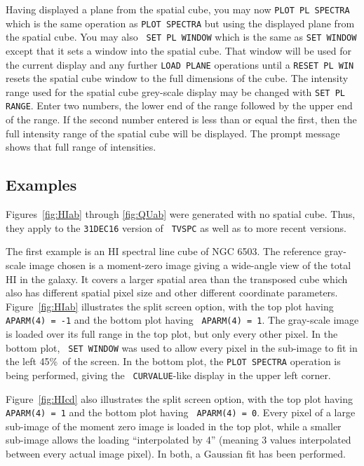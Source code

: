 \documentclass[twoside]{article}
\begin{document}
Having displayed a plane from the spatial cube, you may now {\tt PLOT
  PL SPECTRA} which is the same operation as {\tt PLOT SPECTRA} but
using the displayed plane from the spatial cube.  You may also {\tt
  SET PL WINDOW} which is the same as {\tt SET WINDOW} except that it
sets a window into the spatial cube.  That window will be used for the
current display and any further {\tt LOAD PLANE} operations until a
{\tt RESET PL WIN} resets the spatial cube window to the full
dimensions of the cube.  The intensity range used for the spatial cube
grey-scale display may be changed with {\tt SET PL RANGE}\@.  Enter
two numbers, the lower end of the range followed by the upper end of
the range.  If the second number entered is less than or equal the
first, then the full intensity range of the spatial cube will be
displayed.  The prompt message shows that full range of intensities.

\subsection{Examples}

Figures~\ref{fig:HIab} through \ref{fig:QUab} were generated with no
spatial cube.  Thus, they apply to the {\tt 31DEC16} version of {\tt
  TVSPC} as well as to more recent versions.

The first example is an HI spectral line cube of NGC 6503.  The
reference gray-scale image chosen is a moment-zero image giving a
wide-angle view of the total HI in the galaxy.  It covers a larger
spatial area than the transposed cube which also has different spatial
pixel size and other different coordinate parameters.
Figure~\ref{fig:HIab} illustrates the split screen option, with the
top plot having {\tt APARM(4) = -1} and the bottom plot having {\tt
  APARM(4) = 1}\@.  The gray-scale image is loaded over its full range
in the top plot, but only every other pixel.  In the bottom plot, {\tt
  SET WINDOW} was used to allow every pixel in the sub-image to fit in
the left 45\%\ of the screen.  In the bottom plot, the {\tt PLOT
  SPECTRA} operation is being performed, giving the {\tt
  CURVALUE}-like display in the upper left corner.

Figure~\ref{fig:HIcd} also illustrates the split screen option, with
the top plot having {\tt APARM(4) = 1} and the bottom plot having {\tt
  APARM(4) = 0}\@.  Every pixel of a large sub-image of the moment
zero image is loaded in the top plot, while a smaller sub-image allows
the loading ``interpolated by 4'' (meaning 3 values interpolated
between every actual image pixel).  In both, a Gaussian fit has been
performed.
\end{document}
